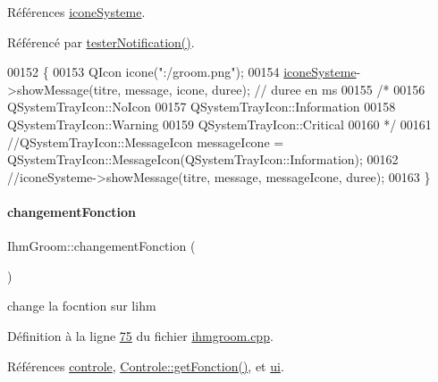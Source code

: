Références \hyperlink{ihmgroom_8h_source_l00093}{icone\+Systeme}.



Référencé par \hyperlink{ihmgroom_8cpp_source_l00175}{tester\+Notification()}.


\begin{DoxyCode}
00152 \{
00153     QIcon icone(\textcolor{stringliteral}{":/groom.png"});
00154     \hyperlink{class_ihm_groom_a9ca0929cf284a9a2e3e2bc3489249919}{iconeSysteme}->showMessage(titre, message, icone, duree); \textcolor{comment}{// duree en ms}
00155     \textcolor{comment}{/*}
00156 \textcolor{comment}{    QSystemTrayIcon::NoIcon}
00157 \textcolor{comment}{    QSystemTrayIcon::Information}
00158 \textcolor{comment}{    QSystemTrayIcon::Warning}
00159 \textcolor{comment}{    QSystemTrayIcon::Critical}
00160 \textcolor{comment}{    */}
00161     \textcolor{comment}{//QSystemTrayIcon::MessageIcon messageIcone =
       QSystemTrayIcon::MessageIcon(QSystemTrayIcon::Information);}
00162     \textcolor{comment}{//iconeSysteme->showMessage(titre, message, messageIcone, duree);}
00163 \}
\end{DoxyCode}
\mbox{\label{class_ihm_groom_afc6c48489b270b22a660e32668d6b2ca}} 
\paragraph{\texorpdfstring{changement\+Fonction}{changementFonction}}
{\footnotesize\ttfamily Ihm\+Groom\+::changement\+Fonction (\begin{DoxyParamCaption}{ }\end{DoxyParamCaption})\hspace{0.3cm}{\ttfamily [slot]}}



change la focntion sur l\textquotesingle{}ihm 



Définition à la ligne \hyperlink{ihmgroom_8cpp_source_l00075}{75} du fichier \hyperlink{ihmgroom_8cpp_source}{ihmgroom.\+cpp}.



Références \hyperlink{ihmgroom_8h_source_l00089}{controle}, \hyperlink{controle_8cpp_source_l00096}{Controle\+::get\+Fonction()}, et \hyperlink{ihmgroom_8h_source_l00085}{ui}.




